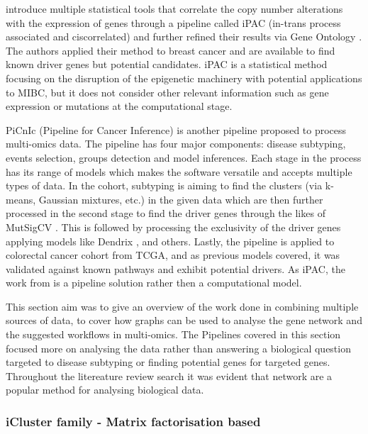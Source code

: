 \citet{Aure2013-je} introduce multiple statistical tools that correlate the copy number alterations with the expression of genes through a pipeline called iPAC (in-trans process associated and ciscorrelated) and further refined their results via Gene Ontology \cite{Carbon2018-ah}. The authors applied their method to breast cancer and are available to find known driver genes but potential candidates. iPAC is a statistical method focusing on the disruption of the epigenetic machinery with potential applications to MIBC, but it does not consider other relevant information such as gene expression or mutations at the computational stage.


PiCnIc (Pipeline for Cancer Inference) \cite{Caravagna2016-vw} is another pipeline proposed to process multi-omics data. The pipeline has four major components: disease subtyping, events selection, groups detection and model inferences\cite{Caravagna2016-vw}. Each stage in the process has its range of models which makes the software versatile and accepts multiple types of data. In the cohort, subtyping is aiming to find the clusters (via k-means, Gaussian mixtures, etc.) in the given data which are then further processed in the second stage to find the driver genes through the likes of MutSigCV \cite{Lawrence2013-pl}. This is followed by processing the exclusivity of the driver genes applying models like Dendrix \cite{Vandin2012-cf}, \cite{Zhao2012-wj} and others. Lastly, the pipeline is applied to colorectal cancer cohort from TCGA, and as previous models covered, it was validated against known pathways and exhibit potential drivers. As iPAC, the work from \cite{Caravagna2016-vw} is a pipeline solution rather then a computational model.

This section aim was to give an overview of the work done in combining multiple sources of data, to cover how graphs can be used to analyse the gene network and the suggested workflows in multi-omics. The Pipelines covered in this section focused more on analysing the data rather than answering a biological question targeted to disease subtyping or finding potential genes for targeted genes. Throughout the litereature review search it was evident that network are a popular method for analysing biological data.

\subsubsection{iCluster family - Matrix factorisation based} \label{s:lit:iCluster}

